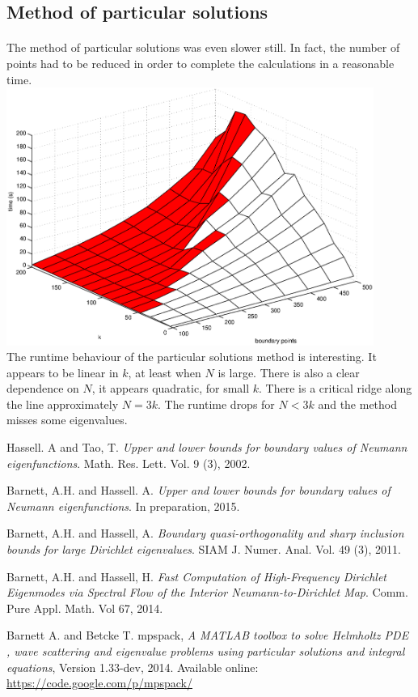 \documentclass{article}
\begin{document}
\subsection{Method of particular solutions}
\paragraph{}
The method of particular solutions was even slower still.
In fact, the number of points had to be reduced in order to complete the calculations in a reasonable time. \\
\includegraphics[width=0.9\textwidth]{ms.eps} \\
The runtime behaviour of the particular solutions method is interesting.
It appears to be linear in $k$, at least when $N$ is large.
There is also a clear dependence on $N$, it appears quadratic, for small $k$.
There is a critical ridge along the line approximately $N = 3 k$.
The runtime drops for $N < 3k$ and the method misses some eigenvalues.

\begin{thebibliography}{9}

Hassell. A and Tao, T.
\textsl{Upper and lower bounds for boundary values of Neumann eigenfunctions}.
Math. Res. Lett. Vol. 9 (3), 2002. %

Barnett, A.H. and Hassell. A.
\textsl{Upper and lower bounds for boundary values of Neumann eigenfunctions}.
In preparation, 2015.

Barnett, A.H. and Hassell, A.
\textsl{Boundary quasi-orthogonality and sharp inclusion bounds for large Dirichlet eigenvalues}.
SIAM J. Numer. Anal. Vol. 49 (3), 2011.

Barnett, A.H. and Hassell, H.
\textsl{Fast Computation of High-Frequency Dirichlet Eigenmodes via Spectral Flow of the Interior Neumann-to-Dirichlet Map}.
Comm. Pure Appl. Math. Vol 67, 2014.

Barnett A. and Betcke T.
mpspack,
\textsl{A MATLAB toolbox to solve Helmholtz PDE , wave scattering and eigenvalue problems using particular solutions and integral equations},
Version 1.33-dev, 2014.
Available online: \url{https://code.google.com/p/mpspack/}

\end{thebibliography}
\end{document}
